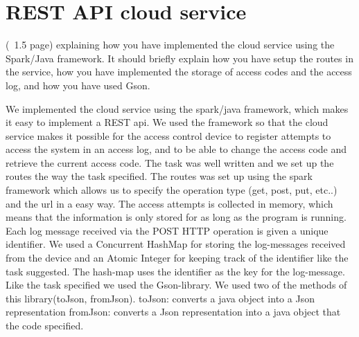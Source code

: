 \section{REST API cloud service}
\label{sec:experiments}

(~1.5 page) explaining how you have implemented the cloud service using the Spark/Java framework. It should briefly explain how you have setup the routes in the service, how you have implemented the storage of access codes and the access log, and how you have used Gson.


We implemented the cloud service using the spark/java framework, which makes it easy to implement a REST api.
We used the framework so that the cloud service makes it possible for the access control device to register attempts to access the system in an access log, and to be able to change the access code and retrieve the current access code.
The task was well written and we set up the routes the way the task specified. The routes was set up using the spark framework which allows us to specify the operation type (get, post, put, etc..) and the url in a easy way.
The access attempts is collected in memory, which means that the information is only stored for as long as the program is running. Each log message received via the POST HTTP operation is given a unique identifier. We used a Concurrent HashMap for storing the log-messages received from the device and an Atomic Integer for keeping track of the identifier like the task suggested. The hash-map uses the identifier as the key for the log-message.
Like the task specified we used the Gson-library. We used two of the methods of this library(toJson, fromJson).
toJson: converts a java object into a Json representation
fromJson: converts a Json representation into a java object that the code specified.
